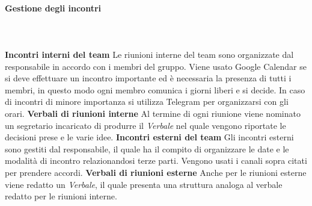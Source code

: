 			\paragraph{Gestione degli incontri} \mbox{}\\ \mbox{}\\
			\textbf{Incontri interni del team} \newline \newline
			Le riunioni interne del team sono organizzate dal responsabile in accordo con i membri del gruppo. Viene usato Google Calendar se si deve effettuare un incontro importante ed è necessaria la presenza di tutti i membri, in questo modo ogni membro comunica i giorni liberi e si decide. In caso di incontri di minore importanza si utilizza Telegram per organizzarsi con gli orari. \newline \newline
			\textbf{Verbali di riunioni interne} \newline \newline
			Al termine di ogni riunione viene nominato un segretario incaricato di produrre il \textit{Verbale} nel quale vengono riportate le decisioni prese e le varie idee. \newline \newline
			\textbf{Incontri esterni del team} \newline \newline
			Gli incontri esterni sono gestiti dal responsabile, il quale ha il compito di organizzare le date e le modalità di incontro relazionandosi terze parti. Vengono usati i canali sopra citati per prendere accordi.
			\newline \newline
			\textbf{Verbali di riunioni esterne} \newline \newline
			Anche per le riunioni esterne viene redatto un \textit{Verbale}, il quale presenta una struttura analoga al verbale redatto per le riunioni interne.  
